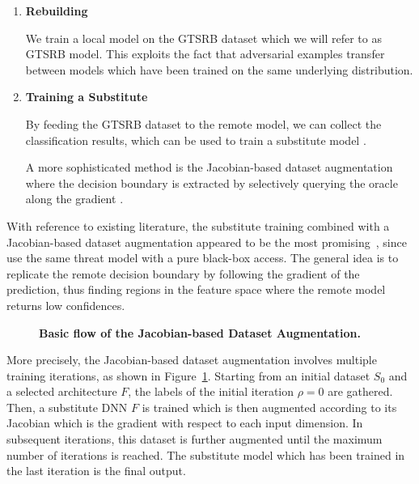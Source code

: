 \begin{enumerate}
\item[1.] \textbf{Rebuilding}

We train a local model on the GTSRB dataset which we will refer to as GTSRB model.
This exploits the fact that adversarial examples transfer between models which have been trained on the same underlying distribution.

\item[2.] \textbf{Training a Substitute}

By feeding the GTSRB dataset to the remote model, we can collect the classification results, which can be used to train a substitute model \cite{tramer2016stealing}.

A more sophisticated method is the Jacobian-based dataset augmentation where the decision boundary is extracted by selectively querying the oracle along the gradient \cite{papernot2017practical}.
\end{enumerate}

With reference to existing literature, the substitute training combined with a Jacobian-based dataset augmentation appeared to be the most promising~\cite{papernot2017practical}, since \citeauthor{papernot2016cleverhans} use the same threat model with a pure black-box access.
The general idea is to replicate the remote decision boundary by following the gradient of the prediction, thus finding regions in the feature space where the remote model returns low confidences.

\begin{figure}
	
	\caption{\textbf{Basic flow of the Jacobian-based Dataset Augmentation.} \cite{papernot2017practical}}
	\label{fig:jbda}
\end{figure}

More precisely, the Jacobian-based dataset augmentation involves multiple training iterations, as shown in Figure~\ref{fig:jbda}.
Starting from an initial dataset $S_0$ and a selected architecture $F$, the labels of the initial iteration $\rho = 0$ are gathered.
Then, a substitute DNN $F$ is trained which is then augmented according to its Jacobian which is the gradient with respect to each input dimension.
In subsequent iterations, this dataset is further augmented until the maximum number of iterations is reached.
The substitute model which has been trained in the last iteration is the final output.

